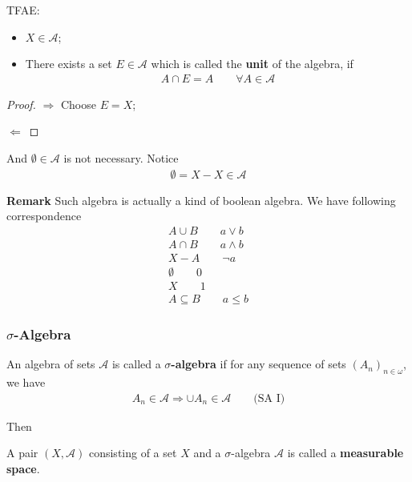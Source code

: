 \documentclass[Total.tex]{subfiles}
\begin{document}
					\begin{proposition}
						TFAE:
						\begin{itemize}
							\item $X\in \mathcal{A}$;
							\item There exists a set $E\in \mathcal{A}$ which is called the \textbf{unit} of the algebra, if
							\begin{gather*}
								A\cap E=A\qquad \forall A\in \mathcal{A}
							\end{gather*}
						\end{itemize}
					\end{proposition}
					\begin{proof}
						$\Rightarrow$ Choose $E=X$;
						
						$\Leftarrow$ 
					\end{proof}
					
					And $\emptyset\in \mathcal{A}$ is not necessary. Notice 
					\begin{gather*}
						\emptyset=X-X\in \mathcal{A}
					\end{gather*}
					
					\textbf{Remark} Such algebra is actually a kind of boolean algebra. We have following correspondence
					\begin{gather*}
						A\cup B\qquad a\vee b\\
						A\cap B\qquad a\wedge b\\
						X-A\qquad \neg a\\
						\emptyset\qquad 0\\
						X\qquad 1\\
						A\subseteq B\qquad a\leq b
					\end{gather*}
				\subsubsection{$\sigma$-Algebra}
					\begin{Def}
						An algebra of sets $\mathcal{A}$ is called a \textbf{$\sigma$-algebra} if for any sequence of sets $(A_n)_{n\in \omega}$, we have
						\begin{gather*}
							A_n\in \mathcal{A}\Rightarrow \cup A_n\in \mathcal{A}\qquad \mbox{(SA I)}
						\end{gather*}
					\end{Def}
					Then
					\begin{Def}
						A pair $(X,\mathcal{A})$ consisting of a set $X$ and a $\sigma$-algebra $\mathcal{A}$ is called a \textbf{measurable space}.
					\end{Def}
					
\end{document}

